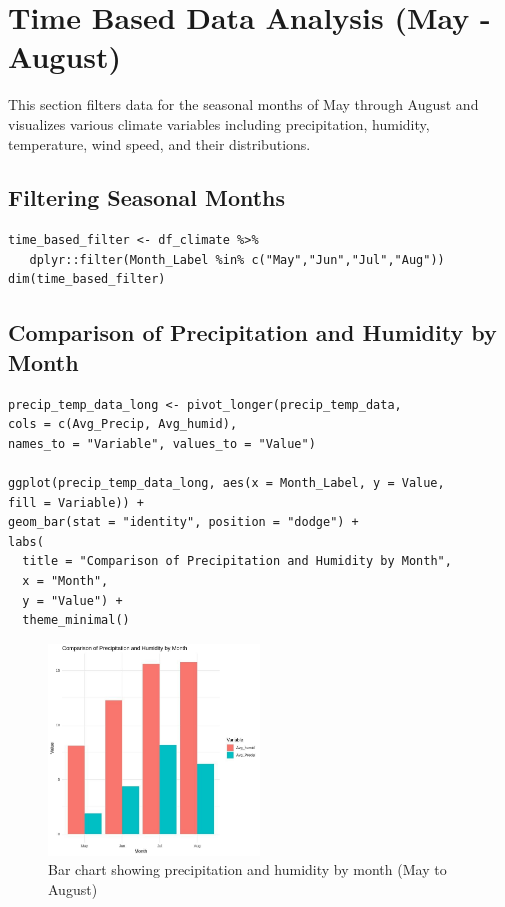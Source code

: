 \section{Time Based Data Analysis (May - August)}

This section filters data for the seasonal months of May through August and visualizes various climate variables including precipitation, humidity, temperature, wind speed, and their distributions.

\subsection*{Filtering Seasonal Months}

\begin{verbatim}
time_based_filter <- df_climate %>%
   dplyr::filter(Month_Label %in% c("May","Jun","Jul","Aug"))
dim(time_based_filter)
\end{verbatim}

\subsection*{Comparison of Precipitation and Humidity by Month}

\begin{verbatim}
precip_temp_data_long <- pivot_longer(precip_temp_data, 
cols = c(Avg_Precip, Avg_humid), 
names_to = "Variable", values_to = "Value")

ggplot(precip_temp_data_long, aes(x = Month_Label, y = Value, 
fill = Variable)) +
geom_bar(stat = "identity", position = "dodge") +
labs(
  title = "Comparison of Precipitation and Humidity by Month",     
  x = "Month", 
  y = "Value") +
  theme_minimal()
\end{verbatim}

\begin{figure}[h]
    \centering
    \includegraphics[width=0.5\textwidth]{figures/bar_time.jpg}
    \caption{Bar chart showing precipitation and humidity by month (May to August)}
\end{figure}

